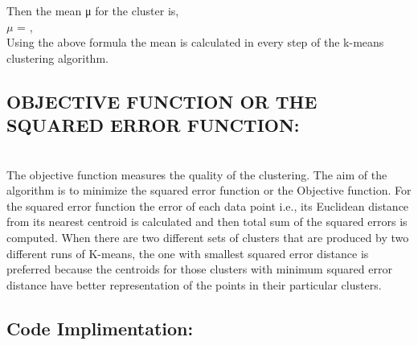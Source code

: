 \documentclass[11pt]{article}
\begin{document}
Then the mean μ for the cluster is,\\
$\mu$ =  ,\\

Using the above formula the mean is calculated in every step of the k-means clustering algorithm.\\


\subsection{OBJECTIVE FUNCTION OR THE SQUARED ERROR FUNCTION:}\\

The objective function measures the quality of the clustering. The aim of the algorithm is to minimize the squared error function or the Objective function. For the squared error function the error of each data point i.e., its Euclidean distance from its nearest centroid is calculated and then total sum of the squared errors is computed. When there are two different sets of clusters that are produced by two different runs of K-means, the one with smallest squared error distance is preferred because the centroids for those clusters with minimum squared error distance have better representation of the points in their particular clusters.


\subsection{Code Implimentation:}
\end{document}
